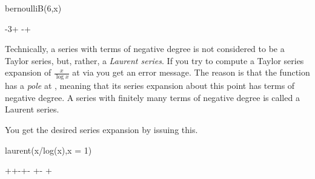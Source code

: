 {{{{{{{{{{{{{{\begin{xtc}
\begin{xtccomment}
\end{xtccomment}
\begin{spadsrc}
bernoulliB(6,x)
\end{spadsrc}
\begin{TeXOutput}
\begin{fricasmath}{7}
-{3\TIMES {}}+\TIMES %
-{\TIMES {}}+%
\end{fricasmath}
\end{TeXOutput}
\end{xtc}

Technically, a series with terms of negative degree is not considered to
be a Taylor series, but, rather, a
{\it Laurent series}.
If you try to compute a Taylor series expansion of
$\frac{x}{\log x}$
at  via 
you get an error message.
The reason is that the function has a {\it pole} at ,
meaning that
its series expansion about this point has terms of negative degree.
A series with finitely many terms of negative degree is called a Laurent
series.
\begin{xtc}
\begin{xtccomment}
You get the desired series expansion by issuing this.
\end{xtccomment}
\begin{spadsrc}
laurent(x/log(x),x = 1)
\end{spadsrc}
\begin{TeXOutput}
\begin{fricasmath}{8}
++\TIMES {}-{\TIMES {}}+\TIMES {}-{\TIMES %
}+\TIMES {}-{\TIMES {}}%
+%
\end{fricasmath}
\end{TeXOutput}
\end{xtc}

}}}}}}}}}}}}}}
